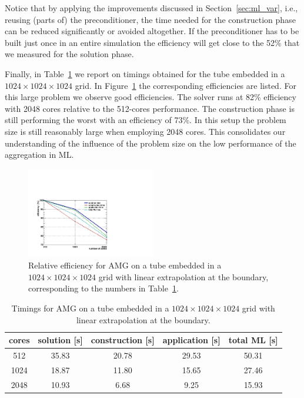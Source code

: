 Notice that by applying the improvements discussed in
Section~\ref{sec:ml_var}, i.e., reusing (parts of) the preconditioner,
the time needed for the construction phase can be reduced significantly
or avoided altogether.  If the preconditioner has to be built just once
in an entire simulation the efficiency will get close to the 52\% that
we measured for the solution phase.  

Finally, in Table~\ref{tbl:timings_solver_1024} we report on timings
obtained for the tube embedded in a $1024\times1024\times1024$ grid.  In
Figure~\ref{fig:speedup_1024} the corresponding efficiencies are listed.
For this large problem we observe good efficiencies.  The solver runs at
82\% efficiency with 2048 cores relative to the 512-cores performance.
The construction phase is still performing the worst with an efficiency
of 73\%.  In this setup the problem size is still reasonably large when
employing 2048 cores.  This consolidates our understanding of the
influence of the problem size on the low performance of the aggregation
in ML.
\begin{figure}[htb] 
  \begin{center}
    \includegraphics[width=0.5\textwidth]{figures/eff_1024_lin.pdf}
    \caption{Relative efficiency for AMG on a tube embedded in a
      $1024\times1024\times1024$ grid with linear extrapolation at the
      boundary, corresponding to the numbers in
      Table~\ref{tbl:timings_solver_1024}.}
    \label{fig:speedup_1024}
  \end{center} 
\end{figure}
\begin{table}[htb]
  \begin{center}
    \begin{tabular}{ccccc}
      \hline
      cores & solution [s] & construction [s] & application [s] & total ML [s] \\
      \hline
      512  &  35.83 &  20.78 &  29.53 &  50.31  \\
      1024 &  18.87 &  11.80 &  15.65 &  27.46  \\
      2048 &  10.93 &  6.68 &  9.25 &  15.93   \\
      \hline
    \end{tabular}
    \caption{Timings for AMG on a tube embedded in a
      $1024\times1024\times1024$ grid with linear extrapolation at the
      boundary.}
    \label{tbl:timings_solver_1024}
  \end{center}
\end{table}

